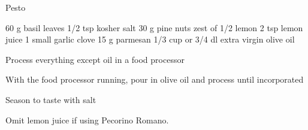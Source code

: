 
\begin{recipe}{Pesto}{\vegetarian{}}
\begin{ingredients}
60 g basil leaves 
1/2 tsp kosher salt
30 g pine nuts
zest of 1/2 lemon
2 tsp lemon juice
1 small garlic clove
15 g parmesan
1/3 cup or 3/4 dl extra virgin olive oil
\end{ingredients}
\nextcolumn
\begin{steps}
    \item Process everything except oil in a food processor
    \item With the food processor running, pour in olive oil and process until incorporated
    \item Season to taste with salt
\end{steps}
Omit lemon juice if using Pecorino Romano.
\end{recipe}

